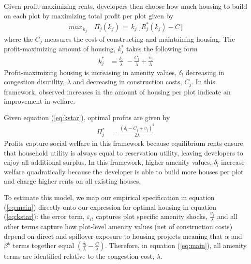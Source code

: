 \documentclass[12pt]{article}
\begin{document}
Given profit-maximizing rents, developers then choose how much housing to build on each plot by maximizing total profit per plot given by
\begin{align*}
max_{\,k_{j}} \,\,\,\,\,\, \Pi_{j}(k_{j}) \,=\, k_{j} \, \Big[ \, R_{j}^{*}(k_{j}) - C \, \Big ]
\end{align*}
\noindent where the $C_j$ measures the cost of constructing and maintaining housing.  The profit-maximizing amount of housing, $k^{*}_{j}$ takes the following form
\begin{align}
\label{eq:kstar}
k_{j}^{*} &= \frac{\delta_{l}}{\lambda} \,\, - \frac{C_j}{\lambda} + \frac{\upsilon_{j}}{\lambda}
\end{align}
Profit-maximizing housing is increasing in amenity values, $\delta_{l}$ decreasing in congestion disutility, $\lambda$ and decreasing in construction costs, $C_j$.  In this framework, observed increases in the amount of housing per plot indicate an improvement in welfare.

Given equation (\ref{eq:kstar}), optimal profits are given by
\begin{align}
\label{eq:profits1}
\Pi_{j}^{*}  &= \frac{(\delta_{l}-C_j + \upsilon_{j} )^2}{2\lambda}
\end{align}
Profits capture social welfare in this framework because equilibrium rents ensure that household utility is always equal to reservation utility, leaving developers to enjoy all additional surplus.  In this framework, higher amenity values, $\delta_{l}$ increase welfare quadratically because the developer is able to build more houses per plot and charge higher rents on all existing houses.

To estimate this model, we map our empirical specification in equation (\ref{eq:main}) directly onto our expression for optimal housing in equation (\ref{eq:kstar}): the error term, $\varepsilon_{it}$ captures plot specific amenity shocks, $\frac{\upsilon_{j}}{\lambda}$ and all other terms capture how plot-level amenity values (net of construction costs) depend on direct and spillover exposure to housing projects meaning that $\alpha$ and $\beta^{k}$ terms together equal $(\frac{\delta_{l}}{\lambda} -\frac{C}{\lambda})$.  Therefore, in equation (\ref{eq:main}), all amenity terms are identified relative to the congestion cost, $\lambda$.
\end{document}
